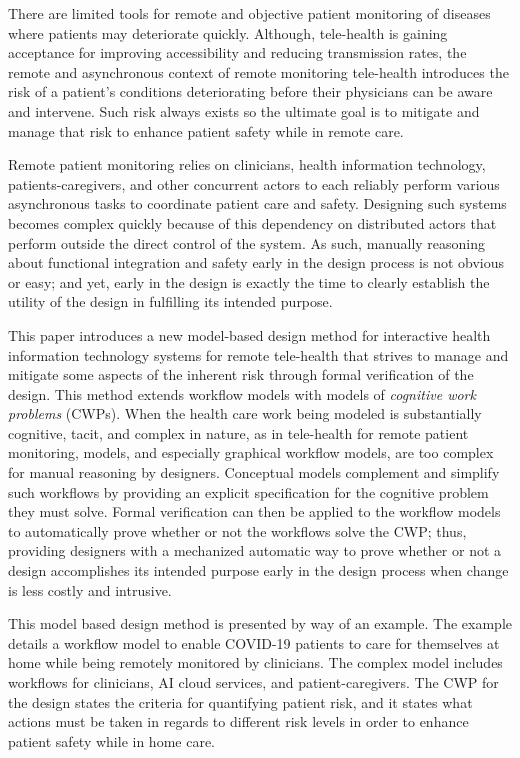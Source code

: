 There are limited tools for remote and objective patient monitoring of diseases where patients may deteriorate quickly. Although, tele-health is gaining acceptance for improving accessibility and reducing transmission rates, the remote and asynchronous context of remote monitoring tele-health introduces the risk of a patient's conditions deteriorating before their physicians can be aware and intervene. Such risk always exists so the ultimate goal is to mitigate and manage that risk to enhance patient safety while in remote care. 

Remote patient monitoring relies on clinicians, health information technology, patients-caregivers, and other concurrent actors to each reliably perform various asynchronous tasks to coordinate patient care and safety. Designing such systems becomes complex quickly because of this dependency on distributed actors that perform outside the direct control of the system. As such, manually reasoning about functional integration and safety early in the design process is not obvious or easy; and yet, early in the design is exactly the time to clearly establish the utility of the design in fulfilling its intended purpose. 

This paper introduces a new model-based design method for interactive health information technology systems for remote tele-health that strives to manage and mitigate some aspects of the inherent risk through formal verification of the design. This method extends workflow models with models of \emph{cognitive work problems} (CWPs). When the health care work being modeled is substantially cognitive, tacit, and complex in nature, as in tele-health for remote patient monitoring, models, and especially graphical workflow models, are too complex for manual reasoning by designers. Conceptual models complement and simplify such workflows by providing an explicit specification for the cognitive problem they must solve. Formal verification can then be applied to the workflow models to automatically prove whether or not the workflows solve the CWP; thus, providing designers with a mechanized automatic way to prove whether or not a design accomplishes its intended purpose early in the design process when change is less costly and intrusive.

This model based design method is presented by way of an example. The example details a workflow model to enable COVID-19 patients to care for themselves at home while being remotely monitored by clinicians. The complex model includes workflows for clinicians, AI cloud services, and patient-caregivers. The CWP for the design states the criteria for quantifying patient risk, and it states what actions must be taken in regards to different risk levels in order to enhance patient safety while in home care. 

